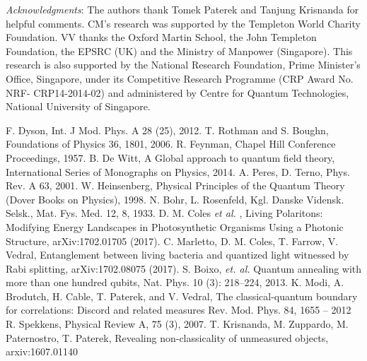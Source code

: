 \documentclass[prl,twocolumn,showpacs,preprintnumbers,amsmath,amssymb]{revtex4}
\newcommand{\qq}[1]{``#1"}
\begin{document}
\textit{Acknowledgments}: 
The authors thank Tomek Paterek and Tanjung Krisnanda for helpful comments. CM's research was supported by the Templeton World Charity Foundation. VV thanks the Oxford Martin School, the John Templeton Foundation, the EPSRC (UK) and the Ministry of Manpower (Singapore). This research is also supported by the National Research Foundation, Prime Minister’s Office, Singapore, under its Competitive Research Programme (CRP Award No. NRF- CRP14-2014-02) and administered by Centre for Quantum Technologies, National University of Singapore. 

\begin{thebibliography}{1}
 F. Dyson, Int. J Mod. Phys. A 28 (25), 2012.	
 T. Rothman and S. Boughn, Foundations of Physics 36, 1801, 2006.
 R. Feynman, Chapel Hill Conference Proceedings, 1957.
 B. De Witt, A Global approach to quantum field theory, International Series of Monographs on Physics, 2014. 
 A. Peres, D. Terno, Phys. Rev. A 63, 2001. 
 W. Heinsenberg, Physical Principles of the Quantum Theory (Dover Books on Physics), 1998.
 N. Bohr, L. Rosenfeld,  Kgl. Danske Vidensk. Selsk., Mat. Fys. Med. 12, 8, 1933.
 D. M. Coles {\sl et al. }, Living Polaritons: Modifying Energy Landscapes in Photosynthetic Organisms Using a Photonic Structure, 	arXiv:1702.01705 (2017). 
 C. Marletto, D. M. Coles, T. Farrow, V. Vedral, Entanglement between living bacteria and quantized light witnessed by Rabi splitting, 	arXiv:1702.08075 (2017). 
 S. Boixo, {\sl et. al.} Quantum annealing with more than one hundred qubits, Nat. Phys. 10 (3): 218–224, 2013.
	 	K. Modi, A. Brodutch, H. Cable, T. Paterek, and V. Vedral, The classical-quantum boundary for correlations: Discord and related measures
	Rev. Mod. Phys. 84, 1655 – 2012
		 R. Spekkens, Physical Review A, 75 (3), 2007.
		 T. Krisnanda,  M. Zuppardo, M. Paternostro, T. Paterek, Revealing non-classicality of unmeasured objects, arxiv:1607.01140
	


\end{thebibliography}
\end{document}

